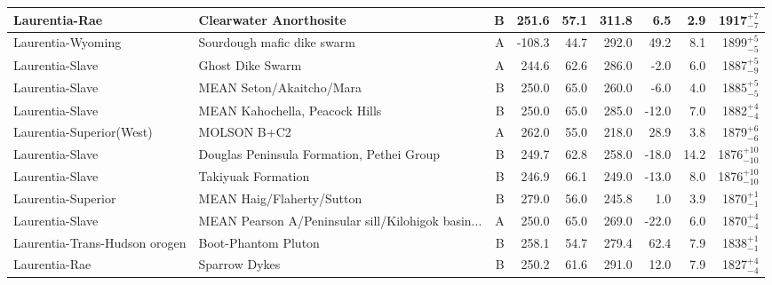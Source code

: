\begin{longtable}{p{1 in}p{1 in}rrrrrrr}
                 Laurentia-Rae &                             Clearwater Anorthosite &      B &     251.6 &      57.1 & 311.8 &   6.5 &       2.9 &     1917$^{+7}_{-7}$ \\ \hline
             Laurentia-Wyoming &                         Sourdough mafic dike swarm &      A &    -108.3 &      44.7 & 292.0 &  49.2 &       8.1 &     1899$^{+5}_{-5}$ \\ \hline
               Laurentia-Slave &                                   Ghost Dike Swarm &      A &     244.6 &      62.6 & 286.0 &  -2.0 &       6.0 &     1887$^{+5}_{-9}$ \\ \hline
               Laurentia-Slave &                           MEAN Seton/Akaitcho/Mara &      B &     250.0 &      65.0 & 260.0 &  -6.0 &       4.0 &     1885$^{+5}_{-5}$ \\ \hline
               Laurentia-Slave &                     MEAN Kahochella, Peacock Hills &      B &     250.0 &      65.0 & 285.0 & -12.0 &       7.0 &     1882$^{+4}_{-4}$ \\ \hline
      Laurentia-Superior(West) &                                        MOLSON B+C2 &      A &     262.0 &      55.0 & 218.0 &  28.9 &       3.8 &     1879$^{+6}_{-6}$ \\ \hline
               Laurentia-Slave &          Douglas Peninsula Formation, Pethei Group &      B &     249.7 &      62.8 & 258.0 & -18.0 &      14.2 &   1876$^{+10}_{-10}$ \\ \hline
               Laurentia-Slave &                                 Takiyuak Formation &      B &     246.9 &      66.1 & 249.0 & -13.0 &       8.0 &   1876$^{+10}_{-10}$ \\ \hline
            Laurentia-Superior &                          MEAN Haig/Flaherty/Sutton &      B &     279.0 &      56.0 & 245.8 &   1.0 &       3.9 &     1870$^{+1}_{-1}$ \\ \hline
               Laurentia-Slave &  MEAN Pearson A/Peninsular sill/Kilohigok basin... &      A &     250.0 &      65.0 & 269.0 & -22.0 &       6.0 &     1870$^{+4}_{-4}$ \\ \hline
 Laurentia-Trans-Hudson orogen &                                Boot-Phantom Pluton &      B &     258.1 &      54.7 & 279.4 &  62.4 &       7.9 &     1838$^{+1}_{-1}$ \\ \hline
                 Laurentia-Rae &                                      Sparrow Dykes &      B &     250.2 &      61.6 & 291.0 &  12.0 &       7.9 &     1827$^{+4}_{-4}$ \\ \hline

\end{longtable}

